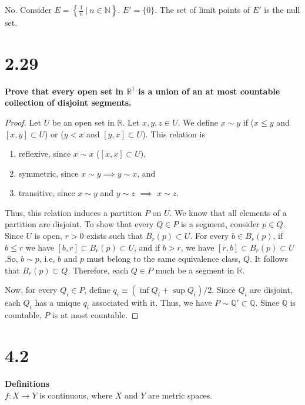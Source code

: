\documentclass[12pt]{article}
\begin{document}
No. Consider $E=\left\{  \frac{1}{n}\ | \ n\in \mathbb{N}  \right\}$. 
$E'=\{ 0 \}$. The set of limit points of $E'$ is the null set. 


\section{2.29}

{\bf Prove that every open set in $\mathbb{R}^{1}$ is a union of an at 
most countable collection of disjoint segments.}

\begin{proof}
      Let $U$ be an open set in $\mathbb{R}$. Let $x, y, z\in U$. 
      We define $x\sim y$ if ($x\leq y$ and $[x, y]\subset U$) or ($y<x$ 
      and $[y, x]\subset U$). This relation is
      \begin{enumerate}
            \item reflexive, since $x\sim x$ ($[x, x]\subset U$),
            \item symmetric, since $x\sim y \implies y \sim x$, and
            \item transitive, since $x\sim y$ and $y\sim z$ $\implies$ $x\sim z$.
      \end{enumerate}
      Thus, this relation induces a partition $P$ on $U$. We know that all 
      elements of a partition are disjoint. To show that every $Q\in P$ is 
      a segment, consider $p\in Q$. Since $U$ is open, $r>0$ exists such 
      that $B_{r}(p)\subset U$. For every $b\in B_{r}(p)$, if $b\leq r$ we 
      have $[b, r]\subset B_{r}(p)\subset U$, and if $b>r$, we have 
      $[r, b]\subset B_{r}(p)\subset U$.So, $b\sim p$, i.e, $b$ and $p$ 
      must belong to the same equivalence class, $Q$. It follows that 
      $B_{r}(p)\subset Q$. Therefore, each $Q\in P$ much be a segment 
      in $\mathbb{R}$. 

      Now, for every $Q_{i}\in P$, define 
      $q_{i}\equiv({\inf Q_{i}+\sup Q_{i}})/2$. Since $Q_{i}$ are disjoint, 
      each $Q_{i}$ has a unique $q_{i}$ associated with it. Thus, 
      we have $P\sim \mathbb{Q}'\subset \mathbb{Q}$. Since $\mathbb{Q}$ 
      is countable, $P$ is at most countable. 
\end{proof}



\section{4.2}

{\bf Definitions}\\
$f:X\to Y$ is continuous, where $X$ and $Y$ are metric spaces.\\
\end{document}
